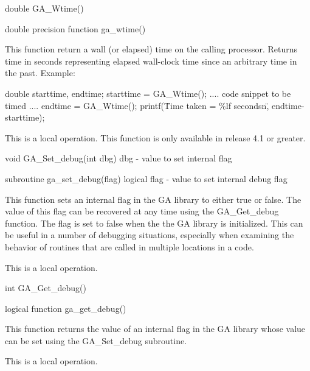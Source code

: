 \documentclass[12pt]{article}
\begin{document}

\begin{capi}
double GA_Wtime()
\end{capi}
\begin{fapi}
double precision function ga_wtime()
\end{fapi}

\begin{desc}

This function return a wall (or elapsed) time on the calling processor. Returns time in seconds representing elapsed wall-clock time since an arbitrary time in the past. Example:

double starttime, endtime;
starttime = GA_Wtime();
.... code snippet to be timed ....
endtime   = GA_Wtime();
printf(\"Time taken = \%lf secondsn\", endtime-starttime);

This is a local operation.
This function is only available in release 4.1 or greater.
\end{desc}


\begin{capi}
void GA_Set_debug(int dbg)
   dbg       - value to set internal flag            \access{[input]} 
\end{capi}
\begin{fapi}
subroutine ga_set_debug(flag)
   logical flag - value to set internal debug flag     \access{[input]} 
\end{fapi}

\begin{desc}

This function sets an internal flag in the GA library to either true or false. The value of this flag can be recovered at any time using the GA_Get_debug function. The flag is set to false when the the GA library is initialized. This can be useful in a number of debugging situations, especially when examining the behavior of routines that are called in multiple locations in a code.

This is a local operation.
\end{desc}


\begin{capi}
int GA_Get_debug()
\end{capi}
\begin{fapi}
logical function ga_get_debug()
\end{fapi}

\begin{desc}

This function returns the value of an internal flag in the GA library whose value can be set using the GA_Set_debug subroutine.

This is a local operation.
\end{desc}
\end{document}
